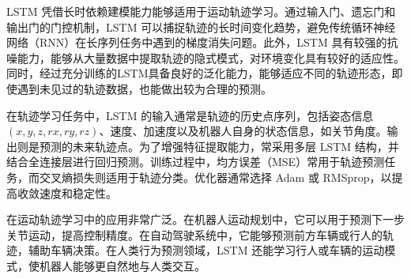 LSTM 凭借长时依赖建模能力能够适用于运动轨迹学习。通过输入门、遗忘门和输出门的门控机制，LSTM 可以捕捉轨迹的长时间变化趋势，避免传统循环神经网络（RNN）在长序列任务中遇到的梯度消失问题。此外，LSTM 具有较强的抗噪能力，能够从大量数据中提取轨迹的隐式模式，对环境变化具有较好的适应性。同时，经过充分训练的LSTM具备良好的泛化能力，能够适应不同的轨迹形态，即使遇到未见过的轨迹数据，也能做出较为合理的预测。

在轨迹学习任务中，LSTM 的输入通常是轨迹的历史点序列，包括姿态信息$(x,y,z,rx,ry,rz)$、速度、加速度以及机器人自身的状态信息，如关节角度。输出则是预测的未来轨迹点。为了增强特征提取能力，常采用多层 LSTM 结构，并结合全连接层进行回归预测。训练过程中，均方误差（MSE）常用于轨迹预测任务，而交叉熵损失则适用于轨迹分类。优化器通常选择 Adam 或 RMSprop，以提高收敛速度和稳定性。

 在运动轨迹学习中的应用非常广泛。在机器人运动规划中，它可以用于预测下一步关节运动，提高控制精度。在自动驾驶系统中，它能够预测前方车辆或行人的轨迹，辅助车辆决策。在人类行为预测领域，LSTM 还能学习行人或车辆的运动模式，使机器人能够更自然地与人类交互。





